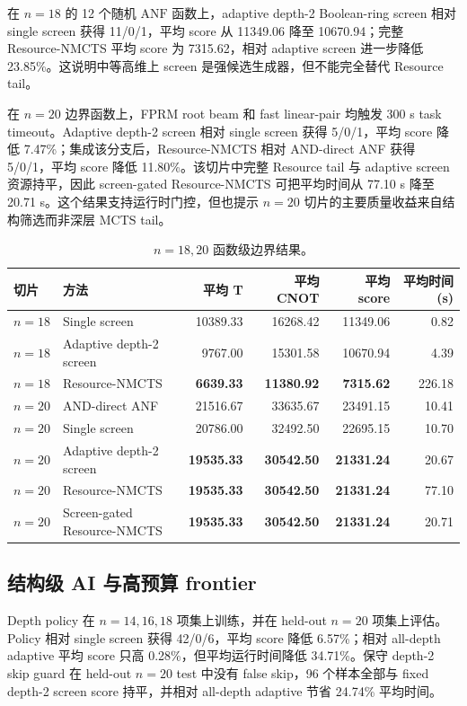\documentclass[UTF8,fontset=macnew,11pt]{ctexart}
\newcommand{\method}{Resource-NMCTS}
\newcommand{\screen}{Boolean-ring screen}
\newcommand{\anf}{\ensuremath{\mathrm{ANF}}}
\newcommand{\mcts}{\ensuremath{\mathrm{MCTS}}}
\begin{document}
在 $n=18$ 的 12 个随机 \anf{} 函数上，adaptive depth-2 \screen{} 相对 single screen 获得 11/0/1，平均 score 从 11349.06 降至 10670.94；完整 \method{} 平均 score 为 7315.62，相对 adaptive screen 进一步降低 23.85\%。这说明中等高维上 screen 是强候选生成器，但不能完全替代 Resource tail。

在 $n=20$ 边界函数上，FPRM root beam 和 fast linear-pair 均触发 300 s task timeout。Adaptive depth-2 screen 相对 single screen 获得 5/0/1，平均 score 降低 7.47\%；集成该分支后，\method{} 相对 AND-direct ANF 获得 5/0/1，平均 score 降低 11.80\%。该切片中完整 Resource tail 与 adaptive screen 资源持平，因此 screen-gated \method{} 可把平均时间从 77.10 s 降至 20.71 s。这个结果支持运行时门控，但也提示 $n=20$ 切片的主要质量收益来自结构筛选而非深层 \mcts{} tail。

\begin{table}[H]
\centering
\scriptsize
\caption{$n=18,20$ 函数级边界结果。}
\label{tab:highdim}
\begin{tabular}{llrrrr}
\toprule
切片 & 方法 & 平均 T & 平均 CNOT & 平均 score & 平均时间(s) \\
\midrule
$n=18$ & Single screen & 10389.33 & 16268.42 & 11349.06 & 0.82 \\
$n=18$ & Adaptive depth-2 screen & 9767.00 & 15301.58 & 10670.94 & 4.39 \\
$n=18$ & \method{} & \textbf{6639.33} & \textbf{11380.92} & \textbf{7315.62} & 226.18 \\
$n=20$ & AND-direct ANF & 21516.67 & 33635.67 & 23491.15 & 10.41 \\
$n=20$ & Single screen & 20786.00 & 32492.50 & 22695.15 & 10.70 \\
$n=20$ & Adaptive depth-2 screen & \textbf{19535.33} & \textbf{30542.50} & \textbf{21331.24} & 20.67 \\
$n=20$ & \method{} & \textbf{19535.33} & \textbf{30542.50} & \textbf{21331.24} & 77.10 \\
$n=20$ & Screen-gated \method{} & \textbf{19535.33} & \textbf{30542.50} & \textbf{21331.24} & 20.71 \\
\bottomrule
\end{tabular}
\end{table}

\subsection{结构级 AI 与高预算 frontier}

Depth policy 在 $n=14,16,18$ 项集上训练，并在 held-out $n=20$ 项集上评估。Policy 相对 single screen 获得 42/0/6，平均 score 降低 6.57\%；相对 all-depth adaptive 平均 score 只高 0.28\%，但平均运行时间降低 34.71\%。保守 depth-2 skip guard 在 held-out $n=20$ test 中没有 false skip，96 个样本全部与 fixed depth-2 screen score 持平，并相对 all-depth adaptive 节省 24.74\% 平均时间。
\end{document}
